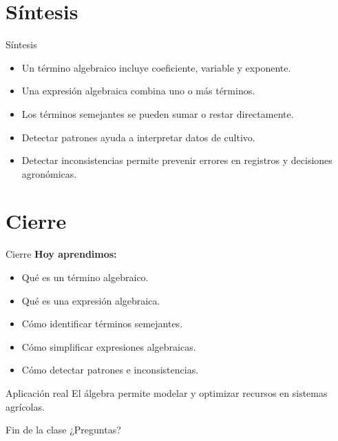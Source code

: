 \documentclass[aspectratio=169,12pt]{beamer}
\begin{document}
	\section{Síntesis}
	\begin{frame}{Síntesis}
		\begin{itemize}[<+->]
			\item Un término algebraico incluye coeficiente, variable y exponente.
			\item Una expresión algebraica combina uno o más términos.
			\item Los términos semejantes se pueden sumar o restar directamente.
			\item Detectar patrones ayuda a interpretar datos de cultivo.
			\item Detectar inconsistencias permite prevenir errores en registros y decisiones agronómicas.
		\end{itemize}
	\end{frame}
	
	\section{Cierre}
	\begin{frame}{Cierre}
		\textbf{Hoy aprendimos:}
		\begin{itemize}[<+->]
			\item Qué es un término algebraico.
			\item Qué es una expresión algebraica.
			\item Cómo identificar términos semejantes.
			\item Cómo simplificar expresiones algebraicas.
			\item Cómo detectar patrones e inconsistencias.
		\end{itemize}
		
		\pause
		\begin{block}{Aplicación real}
			El álgebra permite modelar y optimizar recursos en sistemas agrícolas.
		\end{block}
	\end{frame}
	
	\begin{frame}{Fin de la clase}
		\centering
		\Huge ¿Preguntas?
	\end{frame}
	
\end{document}

